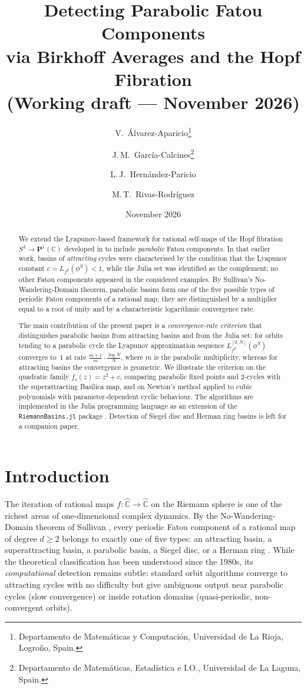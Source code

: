 \documentclass[12pt]{article}
\title{\textbf{Detecting Parabolic Fatou Components\\
        via Birkhoff Averages and the Hopf Fibration}\\[6pt]
       {\large (Working draft --- November 2026)}}
\author{V.~\'Alvarez-Aparicio\thanks{Departamento de Matem\'aticas y
Computaci\'on, Universidad de La Rioja, Logro\~no, Spain.} \and
J.\,M.~Garc\'ia-Calcines\thanks{Departamento de Matem\'aticas,
Estad\'istica e I.O., Universidad de La Laguna, Spain.} \and
L.\,J.~Hern\'andez-Paricio\footnotemark[1] \and
M.\,T.~Rivas-Rodr\'iguez\footnotemark[1]}
\date{November 2026}
\theoremstyle{definition}
\newcommand{\C}{\mathbb{C}}
\newcommand{\Chat}{\hat{\C}}
\newcommand{\Pone}{\mathbf{P}^1(\C)}
\begin{document}
\maketitle
\begin{abstract}
We extend the Lyapunov-based framework for rational self-maps of the Hopf
fibration $S^3 \to \Pone$ developed in \cite{Alvarez2023} to include
\emph{parabolic} Fatou components.  In that earlier work, basins of
\emph{attracting} cycles were characterised by the condition that the
Lyapunov constant $c = L_{f^S}(\phi^S) < 1$, while the Julia set was
identified as the complement; no other Fatou components appeared in the
considered examples.  By Sullivan's No-Wandering-Domain theorem, parabolic
basins form one of the five possible types of periodic Fatou components of
a rational map; they are distinguished by a multiplier equal to a root of
unity and by a characteristic logarithmic convergence rate.

The main contribution of the present paper is a \emph{convergence-rate
criterion} that distinguishes parabolic basins from attracting basins and
from the Julia set: for orbits tending to a parabolic cycle the Lyapunov
approximation sequence $L_{f^S}^{[0,N]}(\phi^S)$ converges to~$1$ at rate
$\tfrac{m+1}{m}\cdot\tfrac{\log N}{N}$, where $m$ is the parabolic
multiplicity, whereas for attracting basins the convergence is geometric.
We illustrate the criterion on the quadratic family $f_c(z)=z^2+c$,
comparing parabolic fixed points and 2-cycles with the superattracting
Basilica map, and on Newton's method applied to cubic polynomials with
parameter-dependent cyclic behaviour.
The algorithms are implemented in the Julia programming language as an
extension of the \texttt{RiemannBasins.jl} package \cite{RiemannBasins}.
Detection of Siegel disc and Herman ring basins is left for a companion paper.
\end{abstract}

\tableofcontents

\section{Introduction}
\label{sec:intro}

The iteration of rational maps $f: \Chat \to \Chat$ on the Riemann sphere
is one of the richest areas of one-dimensional complex dynamics.  By the
No-Wandering-Domain theorem of Sullivan \cite{Sullivan1983}, every periodic
Fatou component of a rational map of degree $d \ge 2$ belongs to exactly
one of five types: an attracting basin, a superattracting basin, a
parabolic basin, a Siegel disc, or a Herman ring \cite{Milnor2006,
Beardon1991, Devaney2003}.  While the theoretical classification has been understood
since the 1980s, its \emph{computational} detection remains subtle:
standard orbit algorithms converge to attracting cycles with no difficulty
but give ambiguous output near parabolic cycles (slow convergence) or
inside rotation domains (quasi-periodic, non-convergent orbits).
\end{document}
